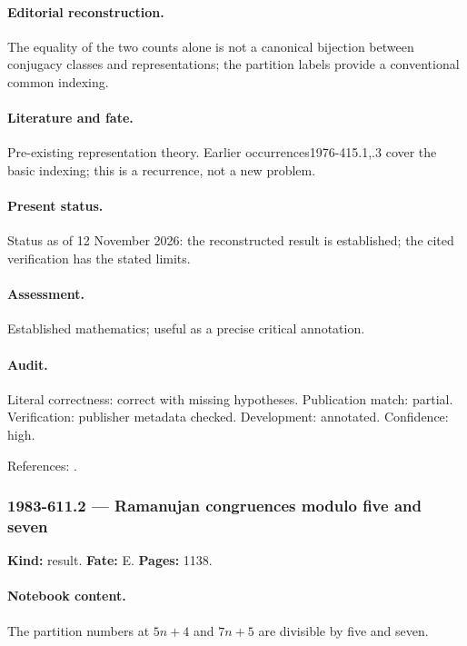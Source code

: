 \paragraph{Editorial reconstruction.} The equality of the two counts alone is not a canonical bijection between conjugacy classes and representations; the partition labels provide a conventional common indexing.

\paragraph{Literature and fate.} Pre-existing representation theory. Earlier occurrences1976-415.1,.3 cover the basic indexing; this is a recurrence, not a new problem.

\paragraph{Present status.} Status as of 12 November 2026: the reconstructed result is established; the cited verification has the stated limits.

\paragraph{Assessment.} Established mathematics; useful as a precise critical annotation.

\paragraph{Audit.} Literal correctness: correct with missing hypotheses. Publication match: partial. Verification: publisher metadata checked. Development: annotated. Confidence: high.

\noindent References: \citep{framerobinsonthrall1954hook}.\par

\subsubsection{1983-611.2 --- Ramanujan congruences modulo five and seven}

\label{item:1983-611.2}

\noindent\textbf{Kind:} result. \textbf{Fate:} E. \textbf{Pages:} 1138.\par

\paragraph{Notebook content.} The partition numbers at $5n+4$ and $7n+5$ are divisible by five and seven.

